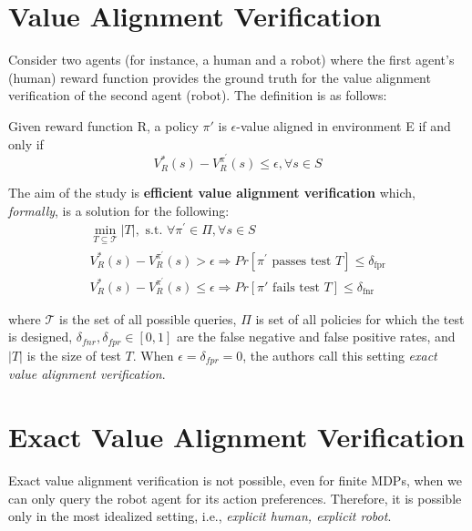 \section{Value Alignment Verification}
\label{sec:Value Alignment Verification}
Consider two agents (for instance, a human and a robot) where the first agent's (human) reward function provides the ground truth for the value alignment verification of the second agent (robot). The definition is as follows:
\begin{defn}
    \label{defn:epsilon-alignment}
    Given reward function R, a policy $\pi'$ is $\epsilon$-value aligned in environment E if and only if
    \begin{equation}
        V_R^*(s) - V_R^{\pi^{'}}(s) \leq \epsilon,\forall s \in S
    \end{equation}
\end{defn}
The aim of the study \cite{brown2021value} is \textbf{efficient value alignment verification} which, \textit{formally}, is a solution for the following:
\begin{equation}
    \begin{split}
        \min_{T \subseteq \mathcal{T}} |T|, \text{ s.t. } \forall \pi^{'} \in \Pi, \forall s \in S\\
        V_R^*(s) - V_R^{\pi^{'}}(s) > \epsilon \Rightarrow Pr[\pi^{'}\text{ passes test }T] \leq \delta_{\text{fpr}}\\
        V_R^*(s) - V_R^{\pi^{'}}(s) \leq \epsilon \Rightarrow Pr[\pi'\text{ fails test }T] \leq \delta_{\text{fnr}}
    \end{split}
\end{equation}
    

where $\mathcal{T}$ is the set of all possible queries, $\Pi$ is set of all policies for which the test is designed, $\delta_{fnr}, \delta_{fpr} \in [0,1]$ are the false negative and false positive rates, and $|T|$ is the size of test $T$. When $\epsilon = \delta_{fpr} = 0$, the authors call this setting \textit{exact value alignment verification}. 

\section{Exact Value Alignment Verification}
\label{sec:Exact Value Alignment Verification}

Exact value alignment verification is not possible, even for finite MDPs, when we can only query the robot agent for its action preferences. Therefore, it is possible only in the most idealized setting, i.e., \textit{explicit human, explicit robot}.

